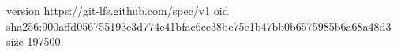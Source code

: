 version https://git-lfs.github.com/spec/v1
oid sha256:900affd056755193e3d774c41bfae6cc38be75e1b47bb0b6575985b6a68a48d3
size 197500
